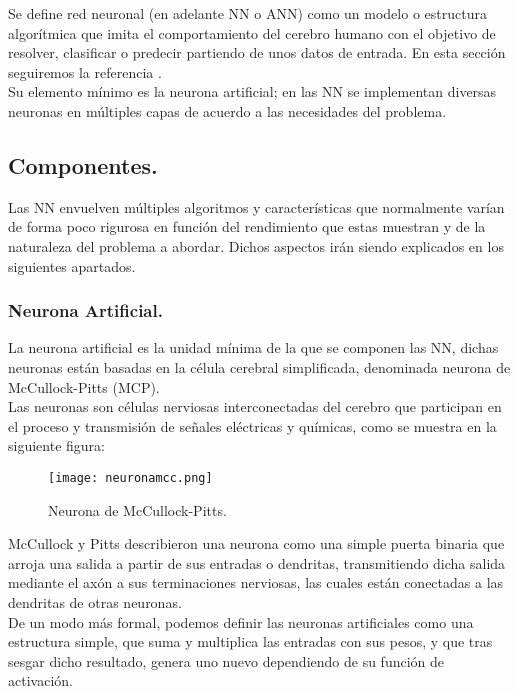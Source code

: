 \documentclass[a4paper,11pt]{article}
\begin{document}
Se define red neuronal (en adelante NN o ANN) como un modelo o estructura algorítmica que imita el comportamiento del cerebro humano con el objetivo de resolver, clasificar o predecir partiendo de unos datos de entrada. En esta sección seguiremos la referencia \cite{andrew}.\\

\noindent
Su elemento mínimo es la neurona artificial; en las NN se implementan diversas neuronas en múltiples capas de acuerdo a las necesidades del problema.

\subsection{Componentes.}
Las NN envuelven múltiples algoritmos y características que normalmente varían de forma poco rigurosa en función del rendimiento que estas muestran y de la naturaleza del problema a abordar. Dichos aspectos irán siendo explicados en los siguientes apartados.
\subsubsection{Neurona Artificial.}
La neurona artificial es la unidad mínima de la que se componen las NN, dichas neuronas están basadas en la célula cerebral simplificada, denominada neurona de McCullock-Pitts (MCP).\cite{andrew}\\

\noindent
 Las neuronas son células nerviosas interconectadas del cerebro que participan en el proceso y transmisión de señales eléctricas y químicas, como se muestra en la siguiente figura: \\

\begin{figure}[H]
\centering
\texttt{[image: neuronamcc.png]}
\caption{Neurona de McCullock-Pitts.}
\end{figure}
\noindent
McCullock y Pitts describieron una neurona como una simple puerta binaria que arroja una salida a partir de sus entradas o dendritas, transmitiendo dicha salida mediante el axón a sus terminaciones nerviosas, las cuales están conectadas a las dendritas de otras neuronas.\\

\noindent
De un modo más formal, podemos definir las neuronas artificiales como una estructura simple, que suma y multiplica las entradas con sus pesos, y que tras sesgar dicho resultado, genera uno nuevo dependiendo de su función de activación. \\
\end{document}
